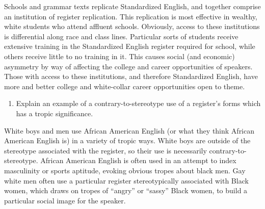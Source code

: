 \documentclass[man,12pt]{apa6}
\providecommand{\tightlist}{%
  \setlength{\itemsep}{0pt}\setlength{\parskip}{0pt}}
\begin{document}
Schools and grammar texts replicate Standardized English, and together
comprise an institution of register replication. This replication is
most effective in wealthy, white students who attend affluent schools.
Obviously, access to these institutions is differential along race and
class lines. Particular sorts of students receive extensive training in
the Standardized English register required for school, while others
receive little to no training in it. This causes social (and economic)
asymmetry by way of affecting the college and career opportunities of
speakers. Those with access to these institutions, and therefore
Standardized English, have more and better college and white-collar
career opportunities open to theme.

\begin{enumerate}
\def\labelenumi{\arabic{enumi}.}
\setcounter{enumi}{11}
\tightlist
\item
  Explain an example of a contrary-to-stereotype use of a register's
  forms which has a tropic significance.
\end{enumerate}

White boys and men use African American English (or what they think
African American English is) in a variety of tropic ways. White boys are
outside of the stereotype associated with the register, so their use is
necessarily contrary-to-stereotype. African American English is often
used in an attempt to index masculinity or sports aptitude, evoking
obvious tropes about black men. Gay white men often use a particular
register stereotypically associated with Black women, which draws on
tropes of ``angry'' or ``sassy'' Black women, to build a particular
social image for the speaker.
\end{document}
